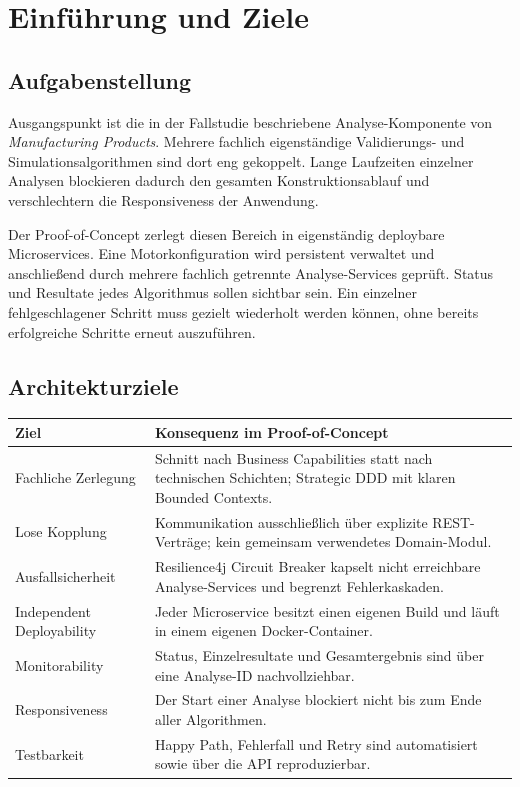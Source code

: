 \section{Einführung und Ziele}
\subsection{Aufgabenstellung}
Ausgangspunkt ist die in der Fallstudie \cite{fallstudie2026} beschriebene Analyse-Komponente von \emph{Manufacturing Products}. Mehrere fachlich eigenständige Validierungs- und Simulationsalgorithmen sind dort eng gekoppelt. Lange Laufzeiten einzelner Analysen blockieren dadurch den gesamten Konstruktionsablauf und verschlechtern die Responsiveness der Anwendung.

Der Proof-of-Concept zerlegt diesen Bereich in eigenständig deploybare Microservices. Eine Motorkonfiguration wird persistent verwaltet und anschlie\ss{}end durch mehrere fachlich getrennte Analyse-Services geprüft. Status und Resultate jedes Algorithmus sollen sichtbar sein. Ein einzelner fehlgeschlagener Schritt muss gezielt wiederholt werden können, ohne bereits erfolgreiche Schritte erneut auszuführen.

\subsection{Architekturziele}
\begin{tabularx}{\textwidth}{L{4.3cm}Y}
\toprule
\textbf{Ziel} & \textbf{Konsequenz im Proof-of-Concept} \\
\midrule
Fachliche Zerlegung & Schnitt nach Business Capabilities statt nach technischen Schichten; Strategic DDD mit klaren Bounded Contexts. \\
Lose Kopplung & Kommunikation ausschlie\ss{}lich über explizite REST-Verträge; kein gemeinsam verwendetes Domain-Modul. \\
Ausfallsicherheit & Resilience4j Circuit Breaker kapselt nicht erreichbare Analyse-Services und begrenzt Fehlerkaskaden. \\
Independent Deployability & Jeder Microservice besitzt einen eigenen Build und läuft in einem eigenen Docker-Container. \\
Monitorability & Status, Einzelresultate und Gesamtergebnis sind über eine Analyse-ID nachvollziehbar. \\
Responsiveness & Der Start einer Analyse blockiert nicht bis zum Ende aller Algorithmen. \\
Testbarkeit & Happy Path, Fehlerfall und Retry sind automatisiert sowie über die API reproduzierbar. \\
\bottomrule
\end{tabularx}


